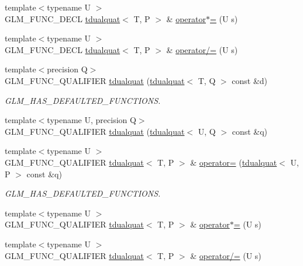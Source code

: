 \begin{DoxyCompactItemize}
{\footnotesize template$<$typename U $>$ }\\G\+L\+M\+\_\+\+F\+U\+N\+C\+\_\+\+D\+E\+C\+L \hyperlink{structglm_1_1tdualquat}{tdualquat}$<$ T, P $>$ \& \hyperlink{structglm_1_1tdualquat_a2ca62c45a69cd875c2d265543ddbd2de}{operator$\ast$=} (U s)
\item 
{\footnotesize template$<$typename U $>$ }\\G\+L\+M\+\_\+\+F\+U\+N\+C\+\_\+\+D\+E\+C\+L \hyperlink{structglm_1_1tdualquat}{tdualquat}$<$ T, P $>$ \& \hyperlink{structglm_1_1tdualquat_ab4cdb5a086d64909be52d436bd05ec11}{operator/=} (U s)
\item 
{\footnotesize template$<$precision Q$>$ }\\G\+L\+M\+\_\+\+F\+U\+N\+C\+\_\+\+Q\+U\+A\+L\+I\+F\+I\+E\+R \hyperlink{structglm_1_1tdualquat_ac7bd63eee979bac07ff5e8db5a4b9141}{tdualquat} (\hyperlink{structglm_1_1tdualquat}{tdualquat}$<$ T, Q $>$ const \&d)
\begin{DoxyCompactList}\small\item\em G\+L\+M\+\_\+\+H\+A\+S\+\_\+\+D\+E\+F\+A\+U\+L\+T\+E\+D\+\_\+\+F\+U\+N\+C\+T\+I\+O\+N\+S. \end{DoxyCompactList}\item 
{\footnotesize template$<$typename U, precision Q$>$ }\\G\+L\+M\+\_\+\+F\+U\+N\+C\+\_\+\+Q\+U\+A\+L\+I\+F\+I\+E\+R \hyperlink{structglm_1_1tdualquat_aca4a77830441c69c03731a331fe3e1ec}{tdualquat} (\hyperlink{structglm_1_1tdualquat}{tdualquat}$<$ U, Q $>$ const \&q)
\item 
{\footnotesize template$<$typename U $>$ }\\G\+L\+M\+\_\+\+F\+U\+N\+C\+\_\+\+Q\+U\+A\+L\+I\+F\+I\+E\+R \hyperlink{structglm_1_1tdualquat}{tdualquat}$<$ T, P $>$ \& \hyperlink{structglm_1_1tdualquat_a4c6247ec39b3e82e5224988ec4312c77}{operator=} (\hyperlink{structglm_1_1tdualquat}{tdualquat}$<$ U, P $>$ const \&q)
\begin{DoxyCompactList}\small\item\em G\+L\+M\+\_\+\+H\+A\+S\+\_\+\+D\+E\+F\+A\+U\+L\+T\+E\+D\+\_\+\+F\+U\+N\+C\+T\+I\+O\+N\+S. \end{DoxyCompactList}\item 
{\footnotesize template$<$typename U $>$ }\\G\+L\+M\+\_\+\+F\+U\+N\+C\+\_\+\+Q\+U\+A\+L\+I\+F\+I\+E\+R \hyperlink{structglm_1_1tdualquat}{tdualquat}$<$ T, P $>$ \& \hyperlink{structglm_1_1tdualquat_a0364e641b3b352f8c3eaa98fc952c737}{operator$\ast$=} (U s)
\item 
{\footnotesize template$<$typename U $>$ }\\G\+L\+M\+\_\+\+F\+U\+N\+C\+\_\+\+Q\+U\+A\+L\+I\+F\+I\+E\+R \hyperlink{structglm_1_1tdualquat}{tdualquat}$<$ T, P $>$ \& \hyperlink{structglm_1_1tdualquat_a1843b865427cf6d2e474959376a1c412}{operator/=} (U s)
\end{DoxyCompactItemize}
